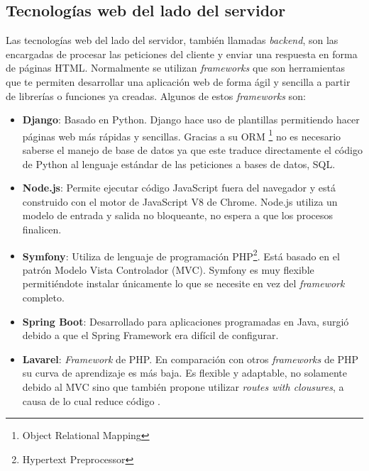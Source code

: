 \subsection{Tecnologías web del lado del servidor}
Las tecnologías web del lado del servidor, también llamadas \textit{backend}, son las encargadas de procesar las peticiones del cliente y enviar una respuesta en forma de páginas HTML. Normalmente se utilizan \textit{frameworks }que son herramientas que te permiten desarrollar una aplicación web de forma ágil y sencilla a partir de librerías o funciones ya creadas. Algunos de estos \textit{frameworks} son:

\begin{itemize}
  \item \textbf{Django}: Basado en Python. Django hace uso de plantillas permitiendo hacer páginas web más rápidas y sencillas. Gracias a su ORM \footnote{Object Relational Mapping} no es necesario saberse el manejo de base de datos ya que este traduce directamente el código de Python al lenguaje estándar de las peticiones a bases de datos, SQL.
  \item \textbf{Node.js}: Permite ejecutar código JavaScript fuera del navegador y está construido con el motor de JavaScript V8 de Chrome. Node.js utiliza un modelo de entrada y salida no bloqueante, no espera a que los procesos finalicen.
  \item \textbf{Symfony}: Utiliza de lenguaje de programación PHP\footnote{Hypertext Preprocessor}. Está basado en el patrón Modelo Vista Controlador (MVC). Symfony es muy flexible permitiéndote instalar únicamente lo que se necesite en vez del \textit{framework} completo.
  \item \textbf{Spring Boot}: Desarrollado para aplicaciones programadas en Java, surgió debido a que el Spring Framework era difícil de configurar. 
\item \textbf{Lavarel}: \textit{Framework} de PHP. En comparación con otros \textit{frameworks } de PHP su curva de aprendizaje es más baja. Es flexible y adaptable, no solamente debido al MVC sino que también propone utilizar \textit{routes with clousures}, a causa de lo cual reduce código \cite{lavarel}.
\end{itemize}

